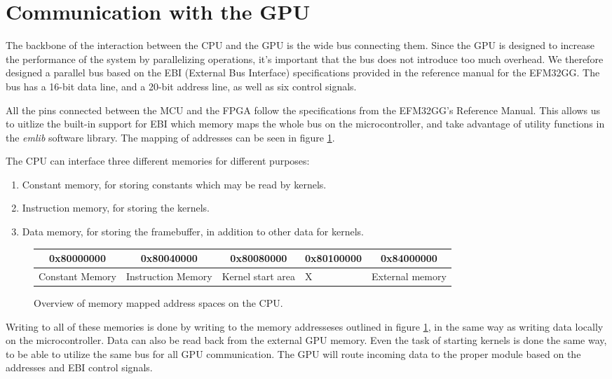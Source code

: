 \documentclass[../main/report.tex]{subfiles}
\begin{document}
\section{Communication with the GPU}

The backbone of the interaction between the CPU and the GPU is the wide bus connecting them.
Since the GPU is designed to increase the performance of the system by parallelizing operations,
it's important that the bus does not introduce too much overhead.
We therefore designed a parallel bus based on the EBI (External Bus Interface) specifications provided
in the reference manual for the EFM32GG\cite[p.175]{efm32gg}.
The bus has a 16-bit data line, and a 20-bit address line, as well as six control signals.

All the pins connected between the MCU and the FPGA follow the specifications from the EFM32GG's Reference Manual\cite[p.175]{efm32gg}.
This allows us to uitlize the built-in support for EBI which memory maps the whole bus on the microcontroller, and take advantage of utility functions in the \emph{emlib} software library\cite{emlib}.
The mapping of addresses can be seen in figure \ref{fig:memory_map}.

The CPU can interface three different memories for different purposes:

\begin{enumerate}
    \item Constant memory, for storing constants which may be read by kernels.
    \item Instruction memory, for storing the kernels.
    \item Data memory, for storing the framebuffer, in addition to other data for kernels.
\end{enumerate}

\begin{figure}[H]
    \centering
    \begin{tabularx}{\textwidth}{|X|X|X|X|X|}
    \multicolumn{1}{c}{0x80000000} & \multicolumn{1}{c}{0x80040000} & \multicolumn{1}{c}{0x80080000} & \multicolumn{1}{c}{0x80100000} & \multicolumn{1}{c}{0x84000000} \\ \hline
    Constant Memory & Instruction Memory & Kernel start area & X & External memory \\ \hline
    \end{tabularx}
    \caption{Overview of memory mapped address spaces on the CPU.}
    \label{fig:memory_map}
\end{figure}

Writing to all of these memories is done by writing to the memory addresseses
outlined in figure \ref{fig:memory_map},
in the same way as writing data locally on the microcontroller.
Data can also be read back from the external GPU memory.
Even the task of starting kernels is done the same way, to be able to utilize the same bus for all GPU communication.
The GPU will route incoming data to the proper module based on the addresses and EBI control signals.
\end{document}
